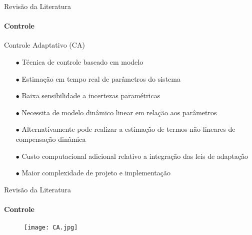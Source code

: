 \documentclass[25pt,landscape]{beamer}
\begin{document}
\begin{frame}{Revisão da Literatura}
    \framesubtitle{Controle}
    \begin{block}{Controle Adaptativo (CA)}
        \begin{itemize}
            \item[$\bullet$] Técnica de controle baseado em modelo \\[8pt]
            \item[$\bullet$] Estimação em tempo real de parâmetros do sistema \\[8pt]
            \item[$\bullet$] Baixa sensibilidade a incertezas paramétricas \\[8pt]
            \item[$\bullet$] Necessita de modelo dinâmico linear em relação aos parâmetros \\[8pt]
            \item[$\bullet$] Alternativamente pode realizar a estimação de termos não lineares de compensação dinâmica \\[8pt]
            \item[$\bullet$] Custo computacional adicional relativo a integração das leis de adaptação \\[8pt]
            \item[$\bullet$] Maior complexidade de projeto e implementação \\[8pt]
        \end{itemize}
    \end{block}
\end{frame}

\begin{frame}{Revisão da Literatura}
    \framesubtitle{Controle}
    \begin{figure}[!h]
        \centering
        \texttt{[image: CA.jpg]}
    \end{figure}  
\end{frame}
\end{document}
